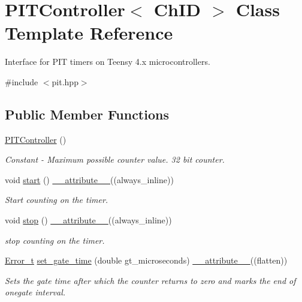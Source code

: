 \hypertarget{classPITController}{}\section{P\+I\+T\+Controller$<$ Ch\+ID $>$ Class Template Reference}
\label{classPITController}


Interface for P\+IT timers on Teensy 4.\+x microcontrollers.  




{\ttfamily \#include $<$pit.\+hpp$>$}

\subsection*{Public Member Functions}
\begin{DoxyCompactItemize}
\item 
\hyperlink{classPITController_ad9ef4f151495076fad7b0c556e48b117}{P\+I\+T\+Controller} ()
\begin{DoxyCompactList}\small\item\em Constant -\/ Maximum possible counter value. 32 bit counter. \end{DoxyCompactList}\item 
void \hyperlink{group__Controls_ga4dae1ed0ada64ebc03665e8f39795e7e}{start} () \hyperlink{utilities_8hpp_a103d5b3998e0dd804213c8f30a094f4d}{\+\_\+\+\_\+attribute\+\_\+\+\_\+}((always\+\_\+inline))
\begin{DoxyCompactList}\small\item\em Start counting on the timer. \end{DoxyCompactList}\item 
void \hyperlink{group__Controls_ga5a6e2b00c6355934531a77a62660bec7}{stop} () \hyperlink{utilities_8hpp_a103d5b3998e0dd804213c8f30a094f4d}{\+\_\+\+\_\+attribute\+\_\+\+\_\+}((always\+\_\+inline))
\begin{DoxyCompactList}\small\item\em stop counting on the timer. \end{DoxyCompactList}\item 
\hyperlink{errors_8hpp_a4e8c0d09726859e3d3369c0da5a1aa7f}{Error\+\_\+t} \hyperlink{group__Controls_gaaf7a79129a4ea5af057ea8f537b7ae9f}{set\+\_\+gate\+\_\+time} (double gt\+\_\+microseconds) \hyperlink{utilities_8hpp_a103d5b3998e0dd804213c8f30a094f4d}{\+\_\+\+\_\+attribute\+\_\+\+\_\+}((flatten))
\begin{DoxyCompactList}\small\item\em Sets the gate time after which the counter returns to zero and marks the end of onegate interval. \end{DoxyCompactList}\item 

\end{DoxyCompactItemize}
